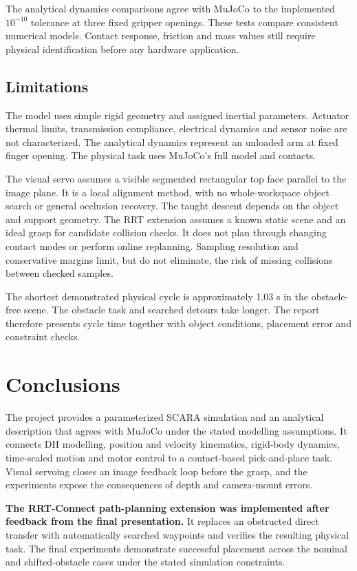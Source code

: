 \documentclass[11pt,a4paper]{article}
\begin{document}
The analytical dynamics comparisons agree with MuJoCo to the implemented
$10^{-10}$ tolerance at three fixed gripper openings. These tests compare
consistent numerical models. Contact response, friction and mass values
still require physical identification before any hardware application.

\subsection{Limitations}
The model uses simple rigid geometry and assigned inertial parameters.
Actuator thermal limits, transmission compliance, electrical dynamics and
sensor noise are not characterized. The analytical dynamics represent an
unloaded arm at fixed finger opening. The physical task uses MuJoCo's full
model and contacts.

The visual servo assumes a visible segmented rectangular top face parallel
to the image plane. It is a local alignment method, with no whole-workspace
object search or general occlusion recovery. The taught descent depends on
the object and support geometry. The RRT extension assumes a known static
scene and an ideal grasp for candidate collision checks. It does not plan
through changing contact modes or perform online replanning. Sampling
resolution and conservative margins limit, but do not eliminate, the risk
of missing collisions between checked samples.

The shortest demonstrated physical cycle is approximately 1.03 s in the
obstacle-free scene. The obstacle task and searched detours take longer.
The report therefore presents cycle time together with object conditions,
placement error and constraint checks.

\section{Conclusions}
The project provides a parameterized SCARA simulation and an analytical
description that agrees with MuJoCo under the stated modelling assumptions.
It connects DH modelling, position and velocity kinematics, rigid-body
dynamics, time-scaled motion and motor control to a contact-based
pick-and-place task. Visual servoing closes an image feedback loop before
the grasp, and the experiments expose the consequences of depth and
camera-mount errors.

\textbf{The RRT-Connect path-planning extension was implemented after
feedback from the final presentation.} It replaces an obstructed direct
transfer with automatically searched waypoints and verifies the resulting
physical task. The final experiments demonstrate successful placement
across the nominal and shifted-obstacle cases under the stated
simulation constraints.
\end{document}
